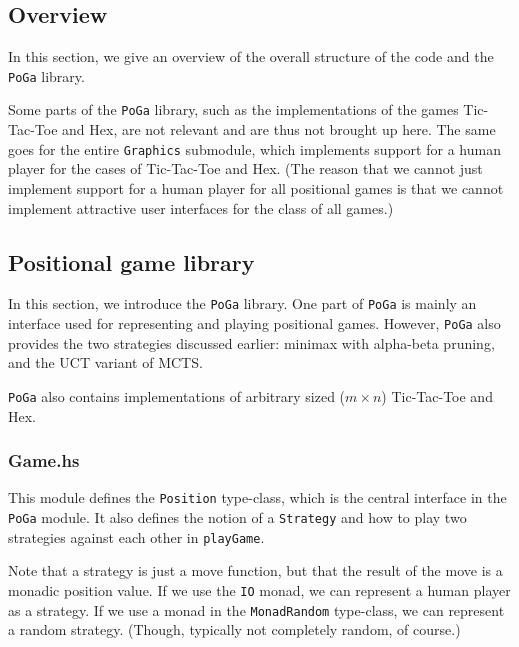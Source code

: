 \subsection {Overview}

In this section, we give an overview of the overall structure of the code and the \texttt{PoGa} library.


Some parts of the \texttt{PoGa} library, such as the implementations of the games Tic-Tac-Toe and Hex, are not relevant and are thus not brought up here.
The same goes for the entire \texttt{Graphics} submodule, which implements support for a human player for the cases of Tic-Tac-Toe and Hex.
(The reason that we cannot just implement support for a human player for all positional games is that we cannot implement attractive user interfaces for the class of all games.)


\subsection {Positional game library}

In this section, we introduce the \texttt{PoGa} library.
One part of \texttt{PoGa} is mainly an interface used for representing and playing positional games.
However, \texttt{PoGa} also provides the two strategies discussed earlier: minimax with alpha-beta pruning, and the UCT variant of MCTS.

\texttt{PoGa} also contains implementations of arbitrary sized ($m \times n$) Tic-Tac-Toe and Hex.

\subsubsection {Game.hs}

This module defines the \texttt{Position} type-class, which is the central interface in the \texttt{PoGa} module.
It also defines the notion of a \texttt{Strategy} and how to play two strategies against each other in \texttt{playGame}.

Note that a strategy is just a move function, but that the result of the move is a monadic position value.
If we use the \texttt{IO} monad, we can represent a human player as a strategy. If we use a monad in the \texttt{MonadRandom} type-class, we can represent a random strategy. (Though, typically not completely random, of course.)

